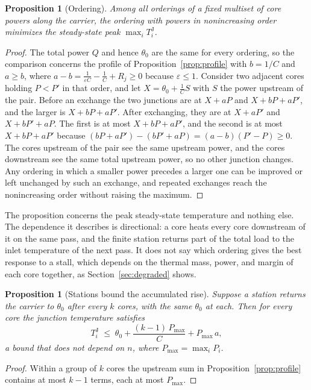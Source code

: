 \documentclass[11pt,openany]{book}
\theoremstyle{plain}
\newtheorem{proposition}[theorem]{Proposition}
\theoremstyle{definition}
\theoremstyle{remark}
\begin{document}
\begin{proposition}[Ordering]\label{prop:order}
Among all orderings of a fixed multiset of core powers along the carrier, the ordering with powers in nonincreasing order minimizes the steady-state peak $\max_i T^{\mathrm J}_i$.
\end{proposition}
\begin{proof}
The total power $Q$ and hence $\theta_0$ are the same for every ordering, so the comparison concerns the profile of Proposition~\ref{prop:profile} with $b=1/C$ and $a\ge b$, where $a-b=\frac{1}{\varepsilon C}-\frac1C+R_j\ge0$ because $\varepsilon\le1$. Consider two adjacent cores holding $P<P'$ in that order, and let $X=\theta_0+\frac1C S$ with $S$ the power upstream of the pair. Before an exchange the two junctions are at $X+aP$ and $X+bP+aP'$, and the larger is $X+bP+aP'$. After exchanging, they are at $X+aP'$ and $X+bP'+aP$. The first is at most $X+bP+aP'$, and the second is at most $X+bP+aP'$ because $(bP+aP')-(bP'+aP)=(a-b)(P'-P)\ge0$. The cores upstream of the pair see the same upstream power, and the cores downstream see the same total upstream power, so no other junction changes. Any ordering in which a smaller power precedes a larger one can be improved or left unchanged by such an exchange, and repeated exchanges reach the nonincreasing order without raising the maximum.
\end{proof}

The proposition concerns the peak steady-state temperature and nothing else. The dependence it describes is directional: a core heats every core downstream of it on the same pass, and the finite station returns part of the total load to the inlet temperature of the next pass. It does not say which ordering gives the best response to a stall, which depends on the thermal mass, power, and margin of each core together, as Section~\ref{sec:degraded} shows.

\begin{proposition}[Stations bound the accumulated rise]\label{prop:stations}
Suppose a station returns the carrier to $\theta_0$ after every $k$ cores, with the same $\theta_0$ at each. Then for every core the junction temperature satisfies
\[
T^{\mathrm J}_i \;\le\; \theta_0+\frac{(k-1)\,P_{\max}}{C}+P_{\max}\,a,
\]
a bound that does not depend on $n$, where $P_{\max}=\max_iP_i$.
\end{proposition}
\begin{proof}
Within a group of $k$ cores the upstream sum in Proposition~\ref{prop:profile} contains at most $k-1$ terms, each at most $P_{\max}$.
\end{proof}
\end{document}
